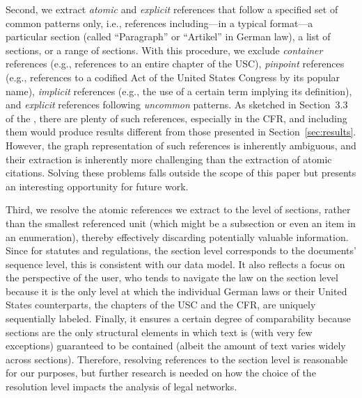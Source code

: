 Second, we extract \emph{atomic} and \emph{explicit} references that follow a specified set of common patterns only, i.e., references including---in a typical format---a particular section (called ``Paragraph'' or ``Artikel'' in German law), a list of sections, or a range of sections.
With this procedure, we exclude \emph{container} references (e.g., references to an entire chapter of the USC), \emph{pinpoint} references (e.g., references to a codified Act of the United States Congress by its popular name), \emph{implicit} references (e.g., the use of a certain term implying its definition), and \emph{explicit} references following \emph{uncommon} patterns.
As sketched in Section~3.3 of the \thesi, there are plenty of such references, especially in the CFR, and including them would produce results different from those presented in Section~\ref{sec:results}.
However, the graph representation of such references is inherently ambiguous, 
and their extraction is inherently more challenging than the extraction of atomic citations.
Solving these problems falls outside the scope of this paper but presents an interesting opportunity for future work.

Third, we resolve the atomic references we extract to the level of sections, rather than the smallest referenced unit (which might be a subsection or even an item in an enumeration), thereby effectively discarding potentially valuable information.
Since for statutes and regulations, the section level corresponds to the documents' sequence level, this is consistent with our data model.
It also reflects a focus on the perspective of the user, who tends to navigate the law on the section level because it is the only level at which the individual German laws or their United States counterparts, the chapters of the USC and the CFR, are uniquely sequentially labeled. 
Finally, it ensures a certain degree of comparability because sections are the only structural elements in which text is (with very few exceptions) guaranteed to be contained (albeit the amount of text varies widely across sections).
Therefore, resolving references to the section level is reasonable for our purposes, but further research is needed on how the choice of the resolution level impacts the analysis of legal networks.
